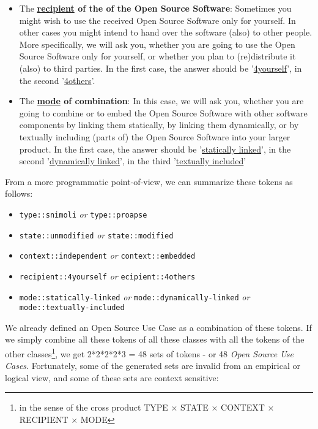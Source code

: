\begin{itemize}
  \item The \textbf{\underline{recipient} of the of the Open Source Software}:
  Sometimes you might wish to use the received Open Source Software only for
  yourself. In other cases you might intend to hand over the software (also) to
  other people. More specifically, we will ask you, whether you are going to use
  the Open Source Software only for yourself, or whether you plan to
  (re)distribute it (also) to third parties. In the first case, the answer
  should be '\underline{4yourself}', in the second '\underline{4others}'.
 
  \item The \textbf{\underline{mode} of combination}: In this case, we will ask
  you, whether you are going to combine or to embed the Open Source Software
  with other software components by linking them statically, by linking them
  dynamically, or by textually including (parts of) the Open Source Software
  into your larger product. In the first case, the answer should be
  '\underline{statically linked}', in the second '\underline{dynamically
  linked}', in the third '\underline{textually included}'
  
\end{itemize}

From a more programmatic point-of-view, we can summarize these tokens as
follows:

\begin{itemize}
  \item \texttt{type::snimoli} \emph{or} \texttt{type::proapse}
  \item \texttt{state::unmodified} \emph{or} \texttt{state::modified}
  \item \texttt{context::independent} \emph{or} \texttt{context::embedded}
  \item \texttt{recipient::4yourself} \emph{or} \texttt{ecipient::4others}
  \item \texttt{mode::statically-linked} \emph{or} \texttt{mode::dynamically-linked}
   \emph{or} \\ \texttt{mode::textually-included}
\end{itemize}

We already defined an Open Source Use Case as a combination of these tokens. If
we simply combine all these tokens of all these classes with all the tokens of
the other classes\footnote{in the sense of the cross product TYPE $\times$ STATE
$\times$ CONTEXT $\times$ RECIPIENT $\times$ MODE}, we get 2*2*2*2*3 = 48 sets
of tokens - or 48 \emph{Open Source Use Cases}. Fortunately, some of the
generated sets are invalid from an empirical or logical view, and some of these
sets are context sensitive:
\label{InvalidFinderTokenCombinations}

